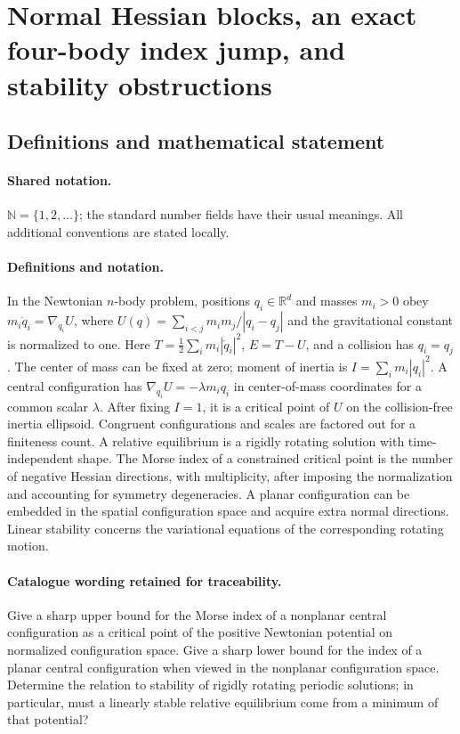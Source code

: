\documentclass[11pt]{article}
\begin{document}
\section{Normal Hessian blocks, an exact four-body index jump, and stability obstructions}\label{statement}

\subsection{Definitions and mathematical statement}

\paragraph{Shared notation.}$\mathbb N=\{1,2,\ldots\}$; the standard number fields have their usual meanings. All additional conventions are stated locally.


\paragraph{Definitions and notation.}In the Newtonian $n$-body problem, positions $q_i\in\mathbb R^d$ and masses $m_i>0$ obey $m_i\ddot q_i=\nabla_{q_i}U$, where $U(q)=\sum_{i<j}m_im_j/|q_i-q_j|$ and the gravitational constant is normalized to one. Here $T=\tfrac12\sum_i m_i|\dot q_i|^2$, $E=T-U$, and a collision has $q_i=q_j$. The center of mass can be fixed at zero; moment of inertia is $I=\sum_i m_i|q_i|^2$. A central configuration has $\nabla_{q_i}U=-\lambda m_iq_i$ in center-of-mass coordinates for a common scalar $\lambda$. After fixing $I=1$, it is a critical point of $U$ on the collision-free inertia ellipsoid. Congruent configurations and scales are factored out for a finiteness count. A relative equilibrium is a rigidly rotating solution with time-independent shape. The Morse index of a constrained critical point is the number of negative Hessian directions, with multiplicity, after imposing the normalization and accounting for symmetry degeneracies. A planar configuration can be embedded in the spatial configuration space and acquire extra normal directions. Linear stability concerns the variational equations of the corresponding rotating motion.

\paragraph{Catalogue wording retained for traceability.}
Give a sharp upper bound for the Morse index of a nonplanar central configuration as a critical point of the positive Newtonian potential on normalized configuration space. Give a sharp lower bound for the index of a planar central configuration when viewed in the nonplanar configuration space. Determine the relation to stability of rigidly rotating periodic solutions; in particular, must a linearly stable relative equilibrium come from a minimum of that potential?
\end{document}
